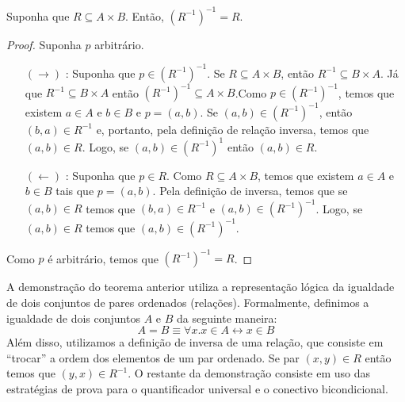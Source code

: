\begin{Theorem}
Suponha que $R \subseteq A \times B$. Então, $(R^{-1})^{-1} = R$.
\end{Theorem}
\begin{proof}
Suponha $p$ arbitrário.
\begin{itemize}
  \item[$(\to)$]: Suponha que $p\in (R^{-1})^{-1}$. Se $R\subseteq A
    \times B$, então $R^{-1}\subseteq B\times A$. Já que
    $R^{-1}\subseteq B\times A$ então $(R^{-1})^{-1}\subseteq A\times
    B$.Como $p\in (R^{-1})^{-1}$, temos que existem $a\in A$ e $b\in
    B$ e $p = (a,b)$. Se $(a,b) \in (R^{-1})^{-1}$, então $(b,a)\in
    R^{-1}$ e, portanto, pela definição de relação inversa, temos que
    $(a,b)\in R$. Logo, se $(a,b)\in
    (R^{-1})^{1}$ então $(a,b)\in R$.
  \item[$(\leftarrow)$]: Suponha que $p \in R$. Como $R\subseteq
    A\times B$,
    temos que existem $a\in A$ e $b\in B$ tais que $p = (a,b)$. Pela
    definição de inversa, temos que se $(a,b)\in R$ temos que $(b,a)
    \in R^{-1}$ e $(a,b) \in (R^{-1})^{-1}$. Logo, se $(a,b) \in R$
    temos que $(a,b) \in (R^{-1})^{-1}$.
\end{itemize}
   Como $p$ é arbitrário, temos que $(R^{-1})^{-1} = R$.
\end{proof}

\begin{Commentary}
A demonstração do teorema anterior utiliza a representação lógica da
igualdade de dois conjuntos de pares ordenados
(relações). Formalmente, definimos a igualdade de dois conjuntos $A$ e
$B$ da seguinte maneira:
\[ A = B \equiv \forall x. x \in A \leftrightarrow x \in B \]
Além disso, utilizamos a definição de inversa de uma relação, que
consiste em ``trocar'' a ordem dos elementos de um par ordenado. Se
par $(x,y)\in R$ então temos que $(y,x)\in R^{-1}$. O restante da
demonstração consiste em uso das estratégias de prova para o
quantificador universal e o conectivo bicondicional.
\end{Commentary}

